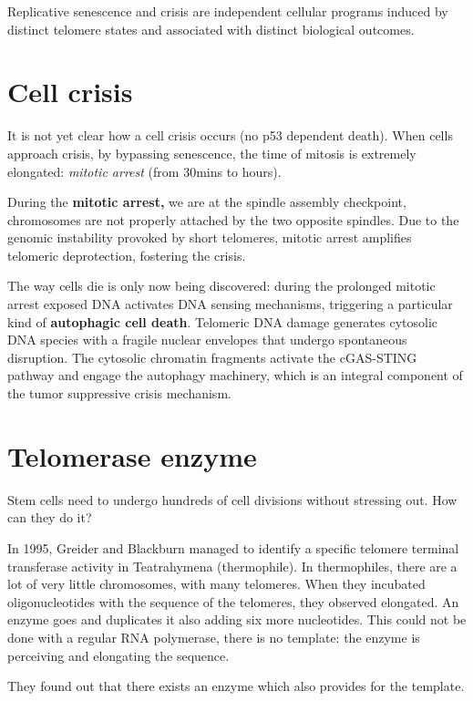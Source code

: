 Replicative senescence and crisis are independent cellular programs
induced by distinct telomere states and associated with distinct
biological outcomes.

\hypertarget{cell-crisis}{%
\section{Cell crisis}\label{cell-crisis}}

It is not yet clear how a cell crisis occurs (no p53 dependent death).
When cells approach crisis, by bypassing senescence, the time of mitosis
is extremely elongated: \emph{mitotic arrest} (from 30mins to hours).

During the \textbf{mitotic arrest,} we are at the spindle assembly
checkpoint, chromosomes are not properly attached by the two opposite
spindles. Due to the genomic instability provoked by short telomeres,
mitotic arrest amplifies telomeric deprotection, fostering the crisis.

The way cells die is only now being discovered: during the prolonged
mitotic arrest exposed DNA activates DNA sensing mechanisms, triggering
a particular kind of \textbf{autophagic cell death}. Telomeric DNA
damage generates cytosolic DNA species with a fragile nuclear envelopes
that undergo spontaneous disruption. The cytosolic chromatin fragments
activate the cGAS-STING pathway and engage the autophagy machinery,
which is an integral component of the tumor suppressive crisis
mechanism.

\hypertarget{telomerase-enzyme}{%
\section{Telomerase enzyme}\label{telomerase-enzyme}}

Stem cells need to undergo hundreds of cell divisions without stressing
out. How can they do it?

In 1995, Greider and Blackburn managed to identify a specific telomere
terminal transferase activity in Teatrahymena (thermophile). In
thermophiles, there are a lot of very little chromosomes, with many
telomeres. When they incubated oligonucleotides with the sequence of the
telomeres, they observed elongated. An enzyme goes and duplicates it
also adding six more nucleotides. This could not be done with a regular
RNA polymerase, there is no template: the enzyme is perceiving and
elongating the sequence.

They found out that there exists an enzyme which also provides for the
template.

